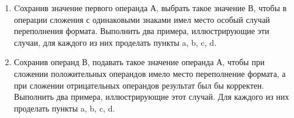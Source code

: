 \documentclass{article}
\begin{document}
\begin{enumerate}
        $$ A_{\MM{доп.}} = 11011100_2 $$
        $$ A < 0,\ B > 0 $$
        $$\begin{array}{ccc|cccccccccccccc}
            \SPACE & \INT                                                                                           \\
                   & \car          & \car &   & \car & \car &   &   &   &   &  & \SIGN &     & \USIGN               \\
            \PLUS  & A_{\MM{доп.}} & 1    & 1 & 0    & 1    & 1 & 1 & 0 & 0 &  & \PLUS & -36 &        & \PLUS & 220  \\
                   & B_{\MM{пр.}}  & 0    & 1 & 0    & 0    & 1 & 0 & 0 & 1 &  &       & 73  &        &       & 73 \\  \cline{2-2} \cline{5-10} \cline{12-13} \cline{15-16}
                   & C_{\MM{пр.}}  & 0    & 0 & 1    & 0    & 0 & 1 & 0 & 1 &  &       & 37 &        &       & 293 \\
          \end{array}
        $$
        $$ CF=1,\ ZF=0,\ PF=1,\ AF=1,\ SF=0,\	OF=1 $$
  \item Cохранив значение первого операнда А, выбрать такое значение В, чтобы в операции сложения с одинаковыми знаками имел место особый случай переполнения формата. Выполнить два примера, иллюстрирующие эти случаи, для каждого из них проделать пункты a, b, c, d.
  \item Сохранив операнд В, подавать такое значение операнда А, чтобы при сложении положительных операндов имело место переполнение формата, а при сложении отрицательных операндов результат был бы корректен. Выполнить два примера, иллюстрирующие этот случай. Для каждого из них проделать пункты a, b, c, d.
\end{enumerate}
\end{document}
